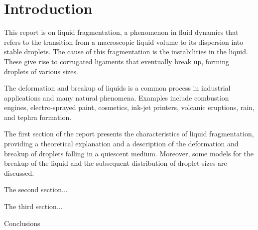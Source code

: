 \chapter{Introduction}
This report is on liquid fragmentation, a phenomenon in fluid dynamics that refers to the transition from a macroscopic liquid volume to its dispersion into stable droplets. 
The cause of this fragmentation is the instabilities in the liquid. These give rise to corrugated ligaments that eventually break up, forming droplets of various sizes. 

The deformation and breakup of liquids is a common process in industrial applications and many natural phenomena. Examples include combustion engines, electro-sprayed paint, cosmetics, ink-jet printers, volcanic eruptions, rain, and tephra formation.

The first section of the report presents the characteristics of liquid fragmentation, providing a theoretical explanation and a description of the deformation and breakup of droplets falling in a quiescent medium.\cite{Mazi_article} Moreover, some models for the breakup of the liquid and the subsequent distribution of droplet sizes are discussed.\cite{Villermaux2007}

The second section...

The third section...

Conclusions